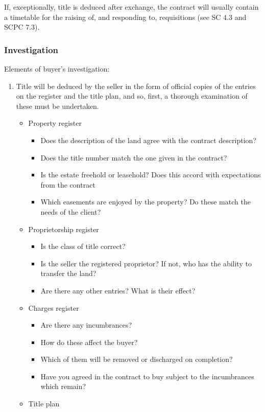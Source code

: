 \documentclass[
]{article}
\providecommand{\tightlist}{%
  \setlength{\itemsep}{0pt}\setlength{\parskip}{0pt}}
\begin{document}
If, exceptionally, title is deduced after exchange, the contract will
usually contain a timetable for the raising of, and responding to,
requisitions (see SC 4.3 and SCPC 7.3).

\hypertarget{investigation}{%
\subsubsection{Investigation}\label{investigation}}

Elements of buyer's investigation:

\begin{enumerate}
\tightlist
\item
  Title will be deduced by the seller in the form of official copies of
  the entries on the register and the title plan, and so, first, a
  thorough examination of these must be undertaken.

  \begin{itemize}
  \tightlist
  \item
    Property register

    \begin{itemize}
    \tightlist
    \item
      Does the description of the land agree with the contract
      description?
    \item
      Does the title number match the one given in the contract?
    \item
      Is the estate freehold or leasehold? Does this accord with
      expectations from the contract
    \item
      Which easements are enjoyed by the property? Do these match the
      needs of the client?
    \end{itemize}
  \item
    Proprietorship register

    \begin{itemize}
    \tightlist
    \item
      Is the class of title correct?
    \item
      Is the seller the registered proprietor? If not, who has the
      ability to transfer the land?
    \item
      Are there any other entries? What is their effect?
    \end{itemize}
  \item
    Charges register

    \begin{itemize}
    \tightlist
    \item
      Are there any incumbrances?
    \item
      How do these affect the buyer?
    \item
      Which of them will be removed or discharged on completion?
    \item
      Have you agreed in the contract to buy subject to the incumbrances
      which remain?
    \end{itemize}
  \item
    Title plan


\end{itemize}
\end{enumerate}
\end{document}
